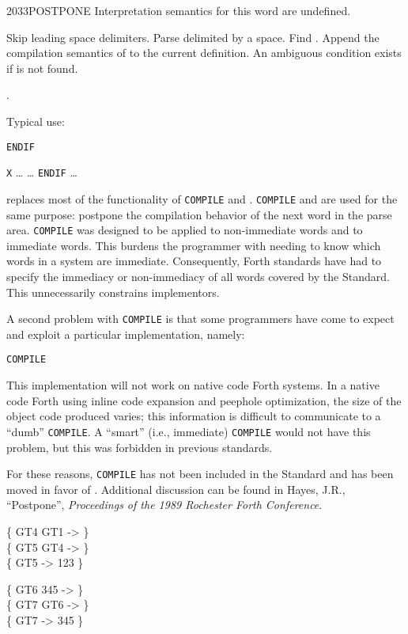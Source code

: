 \begin{worddef}{2033}{POSTPONE}
\interpret
	Interpretation semantics for this word are undefined.

\compile

	Skip leading space delimiters. Parse  delimited by
	a space. Find . Append the compilation semantics of
	 to the current definition. An ambiguous condition
	exists if  is not found.

\see {}.

	\begin{defer}
	\rationale %
		Typical use:

		\tab \word{:} \texttt{ENDIF}
			 
		\word{;} 

		\tab \word{:} \texttt{X} {\ldots}
			 {\ldots} \texttt{ENDIF}
		{\ldots} \word{;}

		 replaces most of the functionality of
		\texttt{COMPILE} and  \word{[COMPILE]}. \texttt{COMPILE} and
		\word{[COMPILE]} are used for the same purpose: postpone the
		compilation behavior of the next word in the parse area.
		\texttt{COMPILE} was designed to be applied to non-immediate
		words and \word{[COMPILE]} to immediate words. This burdens
		the programmer with needing to know which words in a system
		are immediate. Consequently, Forth standards have had to
		specify the immediacy or non-immediacy of all words covered by
		the Standard. This unnecessarily constrains implementors.

		A second problem with \texttt{COMPILE} is that some
		programmers have come to expect and exploit a particular
		implementation, namely:

		\tab \word{:} \texttt{COMPILE} 
			  \word{,}  
		\word{;}

		This implementation will not work on native code Forth systems.
		In a native code Forth using inline code expansion and peephole
		optimization, the size of the object code produced varies; this
		information is difficult to communicate to a ``dumb''
		\texttt{COMPILE}. A ``smart'' (i.e., immediate) \texttt{COMPILE}
		would not have this problem, but this was forbidden in previous
		standards.

		For these reasons, \texttt{COMPILE} has not been included in
		the Standard and \word{[COMPILE]} has been moved in favor of
		. Additional discussion can be found in Hayes,
		J.R., ``Postpone'', \emph{Proceedings of the 1989 Rochester
		Forth Conference}.

	\testing
		\{ \word{:} GT4  GT1 \word{;}  -> \} \\
		\{ \word{:} GT5 GT4 \word{;} -> \} \\
		\{ GT5 -> 123 \}

		\{ \word{:} GT6 345 \word{;}  -> \} \\
		\{ \word{:} GT7  GT6 \word{;} -> \} \\
		\{ GT7 -> 345 \}
	\end{defer}
\end{worddef}


